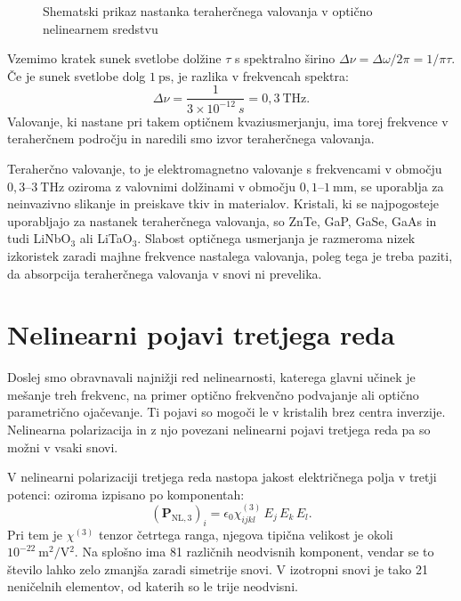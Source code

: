 \begin{figure}[ht]
\centering
\def\svgwidth{100truemm} 

\caption{Shematski prikaz nastanka teraherčnega valovanja v optično nelinearnem sredstvu}
\label{fig:THz}
\end{figure}

Vzemimo kratek sunek svetlobe dolžine $\tau$ s spektralno širino
$\Delta \nu = \Delta \omega/2 \pi = 1/\pi \tau$.
Če je sunek svetlobe dolg $1~\si{\pico\second}$, je razlika v frekvencah 
spektra:
\begin{equation}
\Delta \nu = \frac{1}{3 \times 10^{-12}~\si{s}} = 0,3~\si{\tera\hertz}.
\end{equation}
Valovanje, ki nastane pri takem optičnem kvaziusmerjanju, ima torej frekvence v teraherčnem
področju in naredili smo izvor teraherčnega valovanja. 

Teraherčno valovanje, to je 
elektromagnetno valovanje s frekvencami v območju $0,3$--$3~\si{\tera\hertz}$
oziroma z valovnimi dolžinami v območju $0,1$--$1~\si{\milli\metre}$, 
se uporablja za neinvazivno slikanje in preiskave tkiv in materialov. Kristali, ki 
se najpogosteje uporabljajo za nastanek teraherčnega valovanja, so ZnTe, 
GaP, GaSe, GaAs in tudi LiNbO$_3$ ali LiTaO$_3$. 
Slabost optičnega usmerjanja je razmeroma nizek izkoristek zaradi majhne frekvence
 nastalega valovanja, poleg tega je treba paziti, da absorpcija teraherčnega valovanja
 v snovi ni prevelika.   
 \newpage

\section{Nelinearni pojavi tretjega reda}
Doslej smo obravnavali najnižji red nelinearnosti, katerega glavni
učinek je mešanje treh frekvenc, na primer optično frekvenčno podvajanje ali
optično parametrično ojačevanje. Ti pojavi so mogoči le v kristalih brez centra
inverzije. Nelinearna polarizacija in z njo povezani nelinearni pojavi tretjega reda pa so možni 
v vsaki snovi. 

V nelinearni polarizaciji tretjega reda nastopa jakost 
električnega polja v tretji potenci:
oziroma izpisano po komponentah:
\begin{equation}
\left(\mathbf{P}_{\mathrm{NL,3}}\right)_i= \epsilon_{0}\chi^{(3)}_{ijkl} \,E_j \,E_k\, E_l.
\end{equation}
Pri tem je $\chi^{(3)}$ tenzor četrtega ranga, njegova tipična velikost je okoli 
$10^{-22}~\si{\metre^2/\volt^2}$. Na splošno ima 81 različnih neodvisnih komponent, vendar se to
število lahko zelo zmanjša zaradi simetrije snovi. V izotropni snovi je tako
21 neničelnih elementov, od katerih so le trije neodvisni. 

